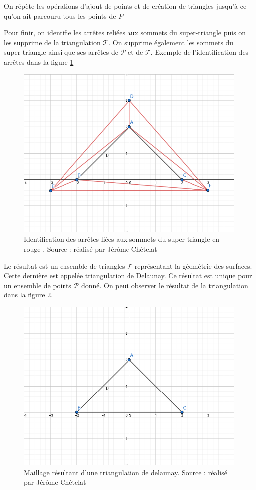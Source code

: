 On répète les opérations d'ajout de points et de création de triangles jusqu'à ce qu'on ait parcouru tous les points de $P$

Pour finir, on identifie les arrêtes reliées aux sommets du super-triangle puis on
les supprime de la triangulation $\mathcal{T}$.
On supprime également les sommets du super-triangle ainsi que ses arrêtes de 
$\mathcal{P}$ et de $\mathcal{T}$. Exemple de l'identification des arrêtes
dans la figure \ref{fig:triangulation_step_9}

\begin{figure}[htbp!]
    \centering
    \includegraphics[width=0.66\linewidth]{figures/bowyer-watson/step_9.png}
    \caption{Identification des arrêtes liées aux sommets du super-triangle en
		rouge . Source : réalisé par
	Jérôme Chételat}
	\label{fig:triangulation_step_9}
\end{figure}

Le résultat est un ensemble de triangles $\mathcal{T}$ représentant la géométrie
des surfaces. Cette dernière est appelée triangulation de Delaunay.
Ce résultat est unique pour un ensemble de points $\mathcal{P}$ donné.
On peut observer le résultat de la triangulation dans la figure \ref{fig:triangulation_step_10}.

\begin{figure}[htbp!]
    \centering
    \includegraphics[width=0.66\linewidth]{figures/bowyer-watson/step_10.png}
    \caption{Maillage résultant d'une triangulation de delaunay. Source : réalisé par Jérôme Chételat}
	\label{fig:triangulation_step_10}
\end{figure}

